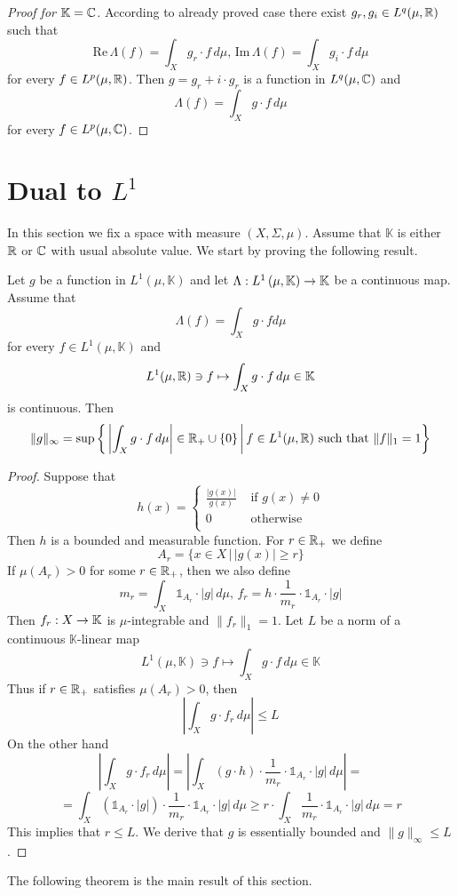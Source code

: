 \begin{proof}[Proof for $\mathbb{K} = {\mathbb C}$]
  According to already proved case there exist $g_r,g_i\in L^q(\mu,{\mathbb R})$ such that
  $$\mathrm{Re}\,\Lambda(f) = \int_X g_r\cdot f\,d\mu,\,\mathrm{Im}\,\Lambda(f) = \int_Xg_i\cdot f\,d\mu$$
  for every $f \in L^p(\mu,{\mathbb R})$. Then $g = g_r + i\cdot g_r$ is a function in $L^q(\mu,{\mathbb C})$ and
  $$\Lambda(f) = \int_Xg\cdot f\,d\mu$$
  for every $f \in L^p(\mu,{\mathbb C})$.
\end{proof}

\section{Dual to $L^1$}
\noindent
In this section we fix a space with measure $(X,\Sigma,\mu)$. Assume that $\mathbb{K}$ is either ${\mathbb R}$ or ${\mathbb C}$ with usual absolute value. We start by proving the following result.

\begin{proposition}\label{proposition:norm_of_standard_functional_for_infinity}
  Let $g$ be a function in $L^1(\mu,\mathbb{K})$ and let $\Lambda:L^1\left(\mu,\mathbb{K}\right)\rightarrow \mathbb{K}$ be a continuous map. Assume that
  $$\Lambda(f) = \int_Xg\cdot f d\mu$$
  for every $f \in L^1(\mu,\mathbb{K})$ and
  $$L^1(\mu,{\mathbb R})\ni f \mapsto \int_Xg\cdot f\,d\mu\in \mathbb{K}$$
  is continuous. Then
  $$\lVert g\rVert_{\infty} = \sup \bigg\{\left|\int_X g\cdot f\,d\mu\right|\in {\mathbb R}_+\cup \{0\}\,\bigg|\,f\in L^1(\mu,{\mathbb R})\mbox{ such that }\lVert f\rVert_1 = 1\bigg\}$$
\end{proposition}
\begin{proof}
  Suppose that
  $$h(x) = \begin{cases}
      \frac{|g(x)|}{g(x)} & \mbox{ if }g(x) \neq 0 \\
      0                   & \mbox{ otherwise}      \\
    \end{cases}
  $$
  Then $h$ is a bounded and measurable function. For $r \in {\mathbb R}_+$ we define
  $$A_{r} = \big\{x\in X\,\big|\,|g(x)| \geq r \big\}$$
  If $\mu(A_r) > 0$ for some $r\in {\mathbb R}_+$, then we also define
  $$m_r = \int_X\mathbb{1}_{A_r}\cdot |g|\,d\mu,\,f_r = h\cdot \frac{1}{m_r}\cdot \mathbb{1}_{A_{r}}\cdot |g|$$
  Then $f_r:X\rightarrow \mathbb{K}$ is $\mu$-integrable and $\lVert f_r\rVert_1 = 1$. Let $L$ be a norm of a continuous $\mathbb{K}$-linear map
  $$L^1(\mu,\mathbb{K})\ni f \mapsto \int_Xg\cdot f\,d\mu\in \mathbb{K}$$
  Thus if $r \in {\mathbb R}_+$ satisfies $\mu(A_r) > 0$, then
  $$\left| \int_Xg\cdot f_r\,d\mu\right| \leq L$$
  On the other hand
  $$\left| \int_Xg\cdot f_r\,d\mu\right| = \left|\int_X \left(g\cdot h\right) \cdot \frac{1}{m_r}\cdot \mathbb{1}_{A_r}\cdot |g|\,d\mu\right| = $$
  $$= \int_X \left(\mathbb{1}_{A_r}\cdot |g|\right) \cdot \frac{1}{m_r}\cdot \mathbb{1}_{A_r}\cdot |g|\,d\mu \geq r\cdot \int_X\frac{1}{m_r}\cdot \mathbb{1}_{A_r}\cdot |g|\,d\mu = r$$
  This implies that $r \leq L$. We derive that $g$ is essentially bounded and $\lVert g\rVert_{\infty} \leq L$.
\end{proof}
\noindent
The following theorem is the main result of this section.

